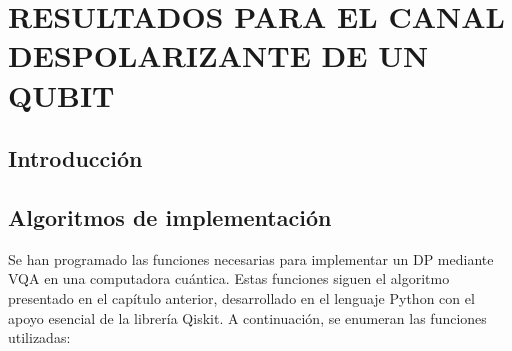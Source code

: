\documentclass[letterpaper,12pt]{thesisECFM}
\theoremstyle{plain}
\theoremstyle{definition}
\theoremstyle{definition}
\theoremstyle{remark}
\newcommand{\1}{\mathbb{1}}
\begin{document}
\chapter{RESULTADOS PARA EL CANAL DESPOLARIZANTE DE UN QUBIT } %
\section{Introducción} %
\section{Algoritmos de implementación} %
Se han programado las funciones necesarias para implementar un DP mediante VQA
en una computadora cuántica. Estas funciones siguen el algoritmo presentado en
el capítulo anterior, desarrollado en el lenguaje Python con el apoyo esencial
de la librería Qiskit. A continuación, se enumeran las funciones utilizadas: 
\end{document}
